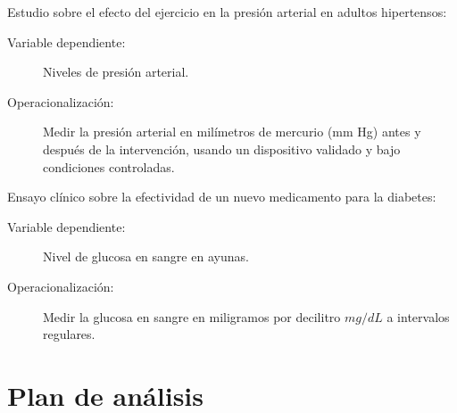 \documentclass[12pt,letterpaper,spanish, twoside]{article}
\begin{document}
\ej Estudio sobre el efecto del ejercicio en la presión arterial en adultos hipertensos:
\begin{description}
    \item[Variable dependiente:] Niveles de presión arterial.
    \item[Operacionalización:] Medir la presión arterial en milímetros de mercurio (mm Hg) antes y después de la intervención, usando un dispositivo validado y bajo condiciones controladas.
\end{description}

\ej Ensayo clínico sobre la efectividad de un nuevo medicamento para la diabetes:
\begin{description}
    \item[Variable dependiente:] Nivel de glucosa en sangre en ayunas.
    \item[Operacionalización:] Medir la glucosa en sangre en miligramos por decilitro $mg/dL$ a intervalos regulares.
\end{description}

\section{Plan de análisis}
\end{document}
